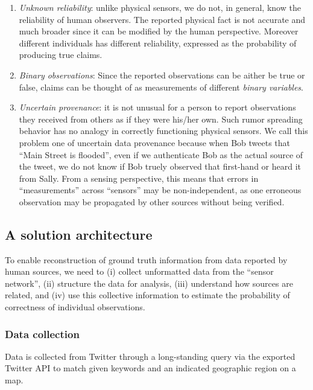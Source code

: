 \documentclass[a4paper,12pt]{article}
\begin{document}
\begin{enumerate}[label=(\roman*)]
	\item \textit{Unknown reliability}: unlike physical sensors, we do not, in general, know the reliability of human observers. The reported physical fact is not accurate and much broader since it can be modified by the human perspective. Moreover different individuals has different reliability, expressed as the probability of producing true claims.
	\item \textit{Binary observations}: Since the reported observations can be aither be true or false, claims can be thought of as measurements of different \textit{binary variables}.
	\item \textit{Uncertain provenance}: it is not unusual for a person to report observations they received from others as if they were his/her own. Such rumor spreading behavior has no analogy in correctly functioning physical sensors. We call this problem one of uncertain data provenance because when Bob tweets that “Main Street is flooded”, even if we authenticate Bob as the actual source of the tweet, we do not know if Bob truely observed that first-hand or heard it from Sally. From a sensing perspective, this means that errors in “measurements” across “sensors” may be non-independent, as one erroneous observation may be propagated by other sources without being verified.
\end{enumerate}

\subsection{A solution architecture}

To enable reconstruction of ground truth information from data reported by human sources, we need to (i) collect unformatted data from the “sensor network”, (ii) structure the data for analysis, (iii) understand how sources are related, and (iv) use this collective information to estimate the probability of correctness of individual observations.

\subsubsection{Data collection}
Data is collected from Twitter through a long-standing query via the exported Twitter API to match given keywords and an indicated geographic region on a map.
\end{document}
